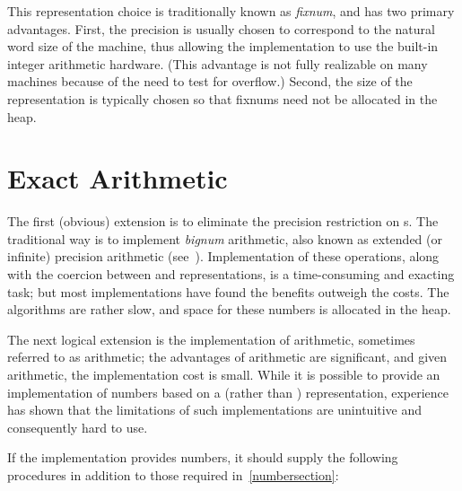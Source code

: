 \vest This representation choice is traditionally known as
{\em fixnum}, and has two primary advantages.  First, the
precision is usually chosen to correspond to the natural word size of
the machine, thus allowing the implementation to use the built-in
integer arithmetic hardware.  (This advantage is not fully realizable
on many machines because of the need to test for overflow.)  Second,
the size of the  representation is typically chosen so
that fixnums need not be allocated in the heap.

\section{Exact Arithmetic}

\vest The first (obvious) extension is to eliminate the precision
restriction on s.  The traditional way is to implement
{\em bignum} arithmetic, also known as extended (or infinite)
precision arithmetic (see~\cite{Knuth}).  Implementation of these
operations, along with the coercion between  and
 representations, is a time-consuming and exacting task;
but most implementations have found the benefits outweigh the costs.
The algorithms are rather slow, and space for these numbers is
allocated in the heap.

\vest The next logical extension is the implementation of 
 arithmetic, sometimes referred to as 
arithmetic; the advantages of   arithmetic
are significant, and given  arithmetic, the
implementation cost is small.  While it is possible to provide an
implementation of   numbers based on a
 (rather than ) representation, experience
has shown that the limitations of such implementations are unintuitive
and consequently hard to use.


\vest If the implementation provides  numbers, it should
supply the following procedures in addition to those required
in~\ref{numbersection}:

